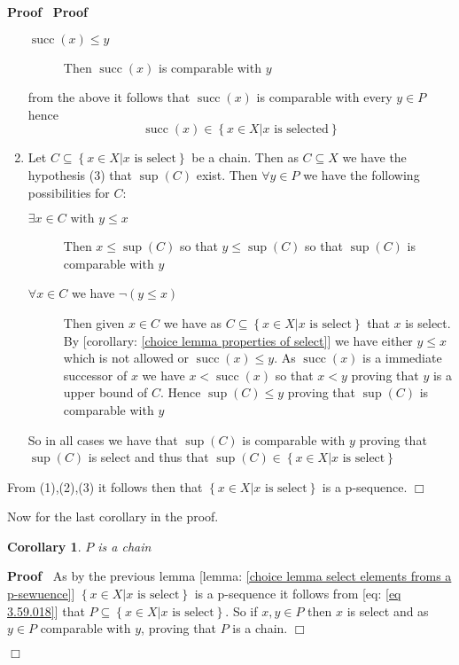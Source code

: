 \documentclass{book}
\newcommand{\tmop}[1]{\ensuremath{\operatorname{#1}}}
\newenvironment{proof}{\noindent\textbf{Proof\ }}{\hspace*{\fill}$\Box$\medskip}
\newtheorem{corollary}{Corollary}
\begin{document}
\begin{proof}
\begin{proof}
\begin{enumerate}
\begin{description}
        \item[$\tmop{succ} (x) \leqslant y$] Then $\tmop{succ} (x)$ is
        comparable with $y$
      \end{description}
      from the above it follows that $\tmop{succ} (x)$ is comparable with
      every $y \in P$ hence
      \[ \tmop{succ} (x) \in \left\{ x \in X|x \text{ is selected} \right\} \]
      \item Let $C \subseteq \left\{ x \in X|x \text{ is select} \right\}$ be
      a chain. Then as $C \subseteq X$ we have the hypothesis (3) that $\sup
      (C)$ exist. Then $\forall y \in P$ we have the following possibilities
      for $C$:
      \begin{description}
        \item[$\exists x \in C \text{ with } y \leqslant x$] Then $x \leqslant
        \sup (C)$ so that $y \leqslant \sup (C)$ so that $\sup (C)$ is
        comparable with $y$
        
        \item[$\forall x \in C$ we have $\neg (y \leqslant x)$] Then given $x
        \in C$ we have as $C \subseteq \left\{ x \in X|x \text{ is select}
        \right\}$ that $x$ is select. By [corollary: \ref{choice lemma
        properties of select}] we have either $y \leqslant x$ which is not
        allowed or $\tmop{succ} (x) \leqslant y$. As $\tmop{succ} (x)$ is a
        immediate successor of $x$ we have $x < \tmop{succ} (x)$ so that $x <
        y$ proving that $y$ is a upper bound of $C$. Hence $\sup (C) \leqslant
        y$ proving that $\sup (C)$ is comparable with $y$
      \end{description}
      So in all cases we have that $\sup (C)$ is comparable with $y$ proving
      that $\sup (C)$ is select and thus that $\sup (C) \in \left\{ x \in X|x
      \text{ is select} \right\}$
    \end{enumerate}
    From (1),(2),(3) it follows then that $\left\{ x \in X|x \text{ is select}
    \right\}$ is a p-sequence.
  \end{proof}
  
  Now for the last corollary in the proof.
  
  \begin{corollary}
    $P$ is a chain
  \end{corollary}
  
  \begin{proof}
    As by the previous lemma [lemma: \ref{choice lemma select elements froms a
    p-sewuence}] $\left\{ x \in X|x \text{ is select} \right\}$ is a
    p-sequence it follows from [eq: \ref{eq 3.59.018}] that $P \subseteq
    \left\{ x \in X|x \text{ is select} \right\}$. So if $x, y \in P$ then $x$
    is select and as $y \in P$ comparable with $y$, proving that $P$ is a
    chain.
  \end{proof}
  

\end{proof}
\end{document}

